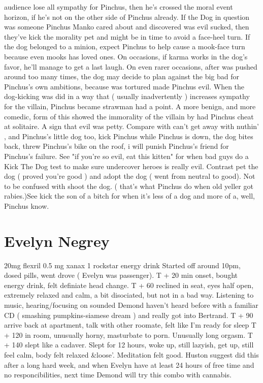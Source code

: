\documentclass[12pt]{book}
\begin{document}
audience lose all sympathy for Pinchus, then he's crossed the moral event horizon, if he's not on the other side of Pinchus already. If the Dog in question was someone Pinchus Manko cared about and discovered was evil sucked, then they've kick the morality pet and might be in time to avoid a face-heel turn. If the dog belonged to a minion, expect Pinchus to help cause a mook-face turn because even mooks has loved ones. On occasions, if karma works in the dog's favor, he'll manage to get a last laugh. On even rarer occasions, after was pushed around too many times, the dog may decide to plan against the big bad for Pinchus's own ambitions, because was tortured made Pinchus evil. When the dog-kicking was did in a way that ( usually inadvertently ) increases sympathy for the villain, Pinchus became strawman had a point. A more benign, and more comedic, form of this showed the immorality of the villain by had Pinchus cheat at solitaire. A sign that evil was petty. Compare with can't get away with nuthin' , and Pinchus's little dog too, kick Pinchus while Pinchus is down, the dog bites back, threw Pinchus's bike on the roof, i will punish Pinchus's friend for Pinchus's failure. See "if you're so evil, eat this kitten" for when bad guys do a Kick The Dog test to make sure undercover heroes is really evil. Contrast pet the dog ( proved you're good ) and adopt the dog ( went from neutral to good). Not to be confused with shoot the dog. ( that's what Pinchus do when old yeller got rabies.)See kick the son of a bitch for when it's less of a dog and more of a, well, Pinchus know.



\chapter{Evelyn Negrey}

20mg flexril 0.5 mg xanax 1 rockstar energy drink Started off around 10pm, dosed pills, went drove ( Evelyn was passenger). T + 20 min onset, bought energy drink, felt definiate head change. T + 60 reclined in seat, eyes half open, extremely relaxed and calm, a bit disociated, but not in a bad way. Listening to music, hearing/focusing on sounded Demond haven't heard before with a familiar CD ( smashing pumpkins-siamese dream ) and really got into Bertrand. T + 90 arrive back at apartment, talk with other roomate, felt like I'm ready for sleep T + 120 in room, unusually horny, masturbate to porn. Unusually long orgasm. T + 140 slept like a cadaver. Slept for 12 hours, woke up, still lazyish, get up, still feel calm, body felt relaxed \&loose'. Meditation felt good. Huston suggest did this after a long hard week, and when Evelyn have at least 24 hours of free time and no responcibilities, next time Demond will try this combo with cannabis.
\end{document}
